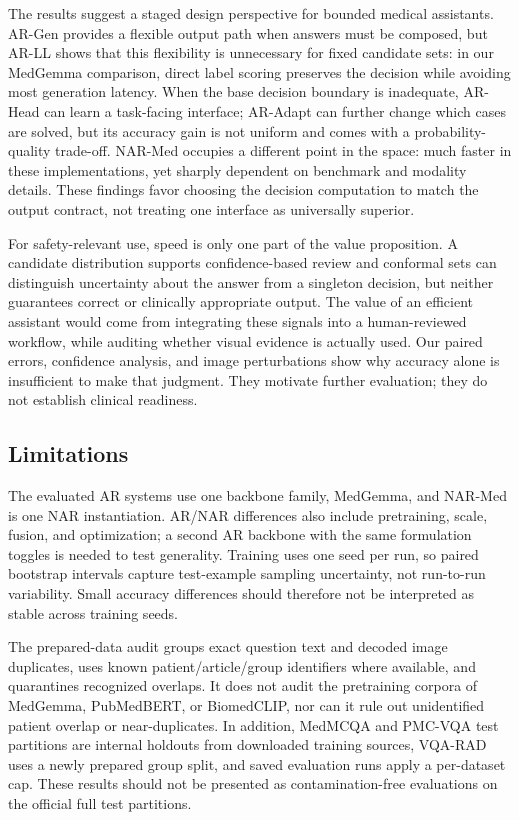 The results suggest a staged design perspective for bounded medical assistants. AR-Gen provides a flexible output path when answers must be composed, but AR-LL shows that this flexibility is unnecessary for fixed candidate sets: in our MedGemma comparison, direct label scoring preserves the decision while avoiding most generation latency. When the base decision boundary is inadequate, AR-Head can learn a task-facing interface; AR-Adapt can further change which cases are solved, but its accuracy gain is not uniform and comes with a probability-quality trade-off. NAR-Med occupies a different point in the space: much faster in these implementations, yet sharply dependent on benchmark and modality details. These findings favor choosing the decision computation to match the output contract, not treating one interface as universally superior.

For safety-relevant use, speed is only one part of the value proposition. A candidate distribution supports confidence-based review and conformal sets can distinguish uncertainty about the answer from a singleton decision, but neither guarantees correct or clinically appropriate output. The value of an efficient assistant would come from integrating these signals into a human-reviewed workflow, while auditing whether visual evidence is actually used. Our paired errors, confidence analysis, and image perturbations show why accuracy alone is insufficient to make that judgment. They motivate further evaluation; they do not establish clinical readiness.

\subsection{Limitations}
\label{sec:limitations}
The evaluated AR systems use one backbone family, MedGemma, and NAR-Med is one NAR instantiation. AR/NAR differences also include pretraining, scale, fusion, and optimization; a second AR backbone with the same formulation toggles is needed to test generality. Training uses one seed per run, so paired bootstrap intervals capture test-example sampling uncertainty, not run-to-run variability. Small accuracy differences should therefore not be interpreted as stable across training seeds.

The prepared-data audit groups exact question text and decoded image duplicates, uses known patient/article/group identifiers where available, and quarantines recognized overlaps. It does not audit the pretraining corpora of MedGemma, PubMedBERT, or BiomedCLIP, nor can it rule out unidentified patient overlap or near-duplicates. In addition, MedMCQA and PMC-VQA test partitions are internal holdouts from downloaded training sources, VQA-RAD uses a newly prepared group split, and saved evaluation runs apply a per-dataset cap. These results should not be presented as contamination-free evaluations on the official full test partitions.

